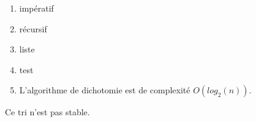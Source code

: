 \documentclass[a4paper,11pt]{article}
\begin{document}
\begin{Form}
\begin{exo}
\begin{enumerate}
\item impératif

\item récursif

\item liste

\item test

\item L'algorithme de dichotomie est de complexité $O(log_2(n))$.
\end{enumerate}
\end{exo}
\begin{exo}

Ce tri n'est pas stable.
\end{exo}
\end{Form}
\end{document}
